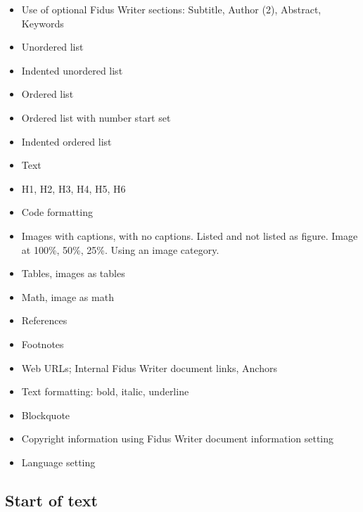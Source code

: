 \documentclass{article}
\begin{document}
\begin{itemize}
\item Use of optional Fidus Writer sections: Subtitle, Author (2), Abstract, Keywords


\item Unordered list


\item Indented unordered list


\item Ordered list


\item Ordered list with number start set


\item Indented ordered list


\item Text


\item H1, H2, H3, H4, H5, H6


\item Code formatting


\item Images with captions, with no captions. Listed and not listed as figure. Image at 100\%, 50\%, 25\%. Using an image category.


\item Tables, images as tables


\item Math, image as math


\item References


\item Footnotes


\item Web URLs; Internal Fidus Writer document links, Anchors


\item Text formatting: bold, italic, underline


\item Blockquote


\item Copyright information using Fidus Writer document information setting


\item Language setting


\end{itemize}

\subsection{Start of text}\label{H1581297}
\end{document}

